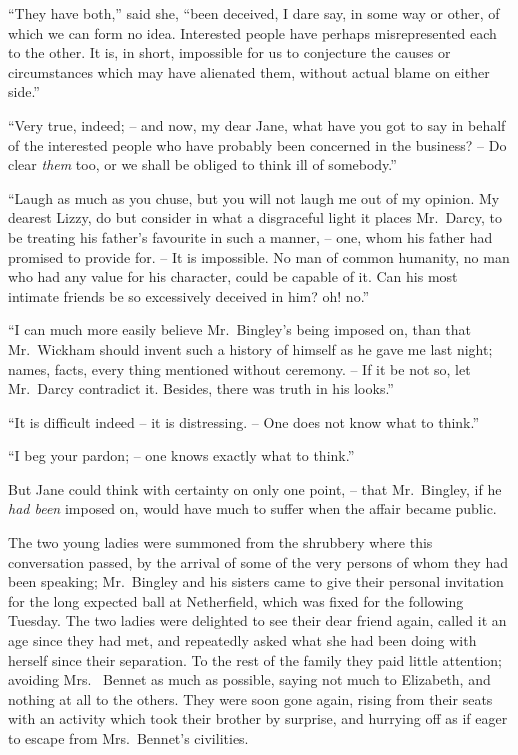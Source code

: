 “They have both,” said she, “been deceived, I dare
say, in some way or other, of which we can form no idea.
Interested people have perhaps misrepresented each to
the other. It is, in short, impossible for us to conjecture
the causes or circumstances which may have alienated
them, without actual blame on either side.”

“Very true, indeed; -- and now, my dear Jane, what
have you got to say in behalf of the interested people
who have probably been concerned in the business? -- Do
clear \textit{them} too, or we shall be obliged to think ill of
somebody.”

“Laugh as much as you chuse, but you will not laugh
me out of my opinion. My dearest Lizzy, do but consider
in what a disgraceful light it places Mr.\ Darcy, to be
treating his father’s favourite in such a manner, -- one,
whom his father had promised to provide for. -- It is impossible.
No man of common humanity, no man who had
any value for his character, could be capable of it. Can
his most intimate friends be so excessively deceived in
him? oh! no.”

“I can much more easily believe Mr.\ Bingley’s being
imposed on, than that Mr.\ Wickham should invent such
a history of himself as he gave me last night; names,
facts, every thing mentioned without ceremony. -- If it be
not so, let Mr.\ Darcy contradict it. Besides, there was
truth in his looks.”

“It is difficult indeed -- it is distressing. -- One does not
know what to think.”

“I beg your pardon; -- one knows exactly what to
think.”

But Jane could think with certainty on only one
point, -- that Mr.\ Bingley, if he \textit{had been} imposed on,
would have much to suffer when the affair became public.

The two young ladies were summoned from the shrubbery
where this conversation passed, by the arrival of
some of the very persons of whom they had been speaking;
Mr.\ Bingley and his sisters came to give their personal
invitation for the long expected ball at Netherfield, which
was fixed for the following Tuesday. The two ladies were
delighted to see their dear friend again, called it an age
since they had met, and repeatedly asked what she had
been doing with herself since their separation. To the rest
of the family they paid little attention; avoiding Mrs.\ %
Bennet as much as possible, saying not much to Elizabeth,
and nothing at all to the others. They were soon gone
again, rising from their seats with an activity which took
their brother by surprise, and hurrying off as if eager
to escape from Mrs.\ Bennet’s civilities.

